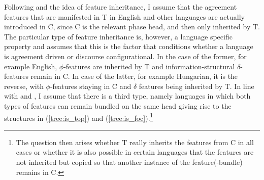 \documentclass[output=paper
,modfonts
,nonflat]{langsci/langscibook}
\begin{document}
\noindent Following \citet{Chomsky2008} and the idea of feature inheritance, I assume that the agreement features that are manifested in T in English and other languages are actually introduced in C, since C is the relevant phase head, and then only inherited by T. The particular type of feature inheritance is, however, a language specific property and \citet{Miyagawa2010,Miyagawa2017} assumes that this is the factor that conditions whether a language is agreement driven or discourse configurational. In the case of the former, for example English, $ \phi $-features are inherited by T and information-structural $ \delta $-features remain in C. In case of the latter, for example Hungarian, it is the reverse, with $ \phi $-features staying in C and $ \delta $ features being inherited by T. In line with \citet{Jimenez-Fernandez2010} and \citet{Miyagawa2017}, I assume that there is a third type, namely languages in which both types of features can remain bundled on the same head giving rise to the structures in (\ref{tree:is_top}) and (\ref{tree:is_foc}).\footnote{The question then arises whether T really inherits the features from C in all cases or whether it is also possible in certain languages that the features are not inherited but copied so that another instance of the feature(-bundle) remains in C.}
\end{document}
